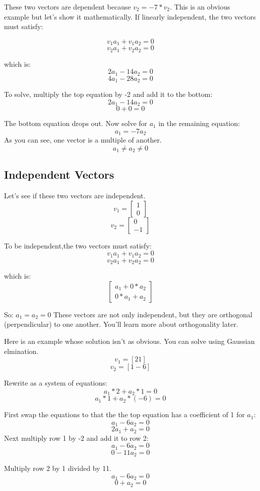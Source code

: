 These two vectors are dependent because $v_2 = -7*v_2$. This is an obvious example but let's show it mathematically. If linearly independent, the two vectors must satisfy:

	$$v_1a_1 + v_1a_2 = 0$$
	$$v_2a_1 + v_2a_2 = 0$$

which is:
	$$2a_1 -14a_2 = 0$$
	$$4a_1 -28a_2 = 0$$

To solve, multiply the top equation by -2 and add it to the bottom: 
$$2a_1 - 14a_2 = 0 $$
$$ 0  + 0     = 0 $$

The bottom equation drops out. Now  solve for $a_1$ in the remaining equation:
$$a_1 = -7a_2$$
As you can see, one vector is a multiple of another. $$a_1 \neq a_2 \neq 0$$

\subsection{Independent Vectors}
Let's see if these two vectors are independent.
$$v_1 = \begin{bmatrix}
1 \\
0
\end{bmatrix}$$
$$v_2 = \begin{bmatrix}
0 \\
-1
\end{bmatrix}$$

To be independent,the two vectors must satisfy:
	$$v_1a_1 + v_1a_2 = 0$$
	$$v_2a_1 + v_2a_2 = 0$$
	
which is:
$$\begin{bmatrix}
	a_1 + 0*a_2 \\
	0*a_1 + a_2
\end{bmatrix}$$

So:
$a_1 = a_2 = 0$
These vectors are not only independent, but they are orthogonal (perpendicular) to one another. You'll learn more about orthogonality later.

Here is an example whose solution isn't as obvious. You can solve using Gaussian elmination.
$$v_1 = [2 1]$$
$$v_2 = [1 -6]$$

Rewrite as a system of equations:
$$a_1*2 + a_2*1 = 0 $$
$$a_1*1 + a_2*(-6) = 0$$

First swap the equations to that the the top equation has a coefficient of 1 for $a_1$:
$$a_1 - 6a_2 = 0$$ 
$$2a_1 + a_2 = 0$$ 
Next multiply row 1 by -2 and add it to row 2:
$$a_1 - 6a_2 = 0$$ 
$$0  - 11a_2 = 0$$ 

Multiply row 2 by 1 divided by 11.
$$a_1 - 6a_2 = 0$$ 
$$0 + a_2 = 0$$ 

